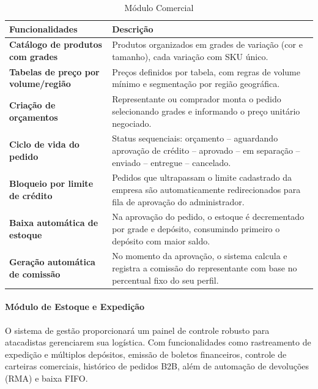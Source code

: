 \documentclass[12pt,a4paper]{article}
\begin{document}
\begin{table}[h!]
  \centering
  \begin{tabularx}{\textwidth}{>{\bfseries}X X}
    \toprule
    Funcionalidades & Descrição \\
    \midrule
    Catálogo de produtos com grades &
      Produtos organizados em grades de variação (cor e tamanho), cada variação com SKU único. \\
    \addlinespace
    Tabelas de preço por volume/região &
      Preços definidos por tabela, com regras de volume mínimo e segmentação por região geográfica. \\
    \addlinespace
    Criação de orçamentos &
      Representante ou comprador monta o pedido selecionando grades e informando o preço unitário negociado. \\
    \addlinespace
    Ciclo de vida do pedido &
      Status sequenciais: orçamento -- aguardando aprovação de crédito -- aprovado -- em separação -- enviado -- entregue -- cancelado. \\
    \addlinespace
    Bloqueio por limite de crédito &
      Pedidos que ultrapassam o limite cadastrado da empresa são automaticamente redirecionados para fila de aprovação do administrador. \\
    \addlinespace
    Baixa automática de estoque &
      Na aprovação do pedido, o estoque é decrementado por grade e depósito, consumindo primeiro o depósito com maior saldo. \\
    \addlinespace
    Geração automática de comissão &
      No momento da aprovação, o sistema calcula e registra a comissão do representante com base no percentual fixo do seu perfil. \\
    \bottomrule
  \end{tabularx}
  \caption{Módulo Comercial}
\end{table}

\paragraph*{Módulo de Estoque e Expedição}

O sistema de gestão proporcionará um painel de controle robusto para atacadistas gerenciarem sua logística. Com funcionalidades como rastreamento de expedição e múltiplos depósitos, emissão de boletos financeiros, controle de carteiras comerciais, histórico de pedidos B2B, além de automação de devoluções (RMA) e baixa FIFO.
\end{document}
